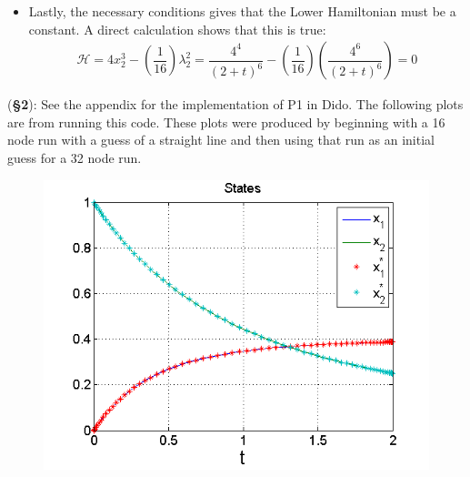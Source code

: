 \documentclass[10pt]{article}
\newcommand{\pdfrac}[2]{\!\left(\dfrac{#1}{#2}\right)\! }
\newcommand{\sch}{\mathcal{H}}
\begin{document}
\begin{enumerate}[leftmargin=*]
\begin{itemize}
         \item Lastly, the necessary conditions gives that the Lower Hamiltonian must be a constant.  A direct calculation shows that this is true:
             \begin{align*}
                \sch = 4x_2^3 - \pdfrac{1}{16}\lambda_2^2 = \dfrac{4^4}{(2+t)^6} - \pdfrac{1}{16}\pdfrac{4^6}{(2+t)^6}=0
             \end{align*}
       \end{itemize}
       (\textbf{\S2}): See the appendix for the implementation of P1 in Dido.  The following plots are from running this code.  These plots were produced by beginning with a 16 node run with a guess of a straight line and then using that run as an initial guess for a 32 node run.

       \begin{figure}[H]
            \centering
            \begin{minipage}{.5\textwidth}
              \centering
              \includegraphics[width=1.\linewidth]{prob1States.png}
              \captionsetup{width=0.8\textwidth}
            \end{minipage}%
            \begin{minipage}{.5\textwidth}
              \centering

\end{minipage}
\end{figure}
\end{enumerate}
\end{document}
